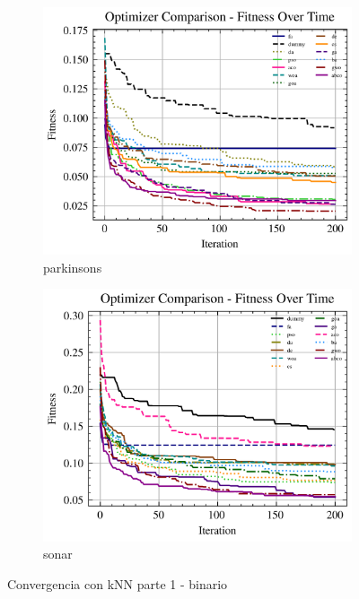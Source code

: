 \begin{figure}[htp]
    \begin{subfigure}[htp]{0.45\textwidth}
        \includegraphics[width=\textwidth]{imagenes/fitness_charts/img/binary/parkinsons/optimizers_fitness_knn.png}
        \caption{parkinsons}
        \label{fig:convergencia_parkinsons_knn}
    \end{subfigure}
    \begin{subfigure}[htp]{0.45\textwidth}
        \includegraphics[width=\textwidth]{imagenes/fitness_charts/img/binary/sonar/optimizers_fitness_knn.png}
        \caption{sonar}
        \label{fig:convergencia_sonar_knn}
    \end{subfigure}
    \caption{Convergencia con kNN parte 1 - binario}
    \label{fig:convergencia_knn_1}
\end{figure}

